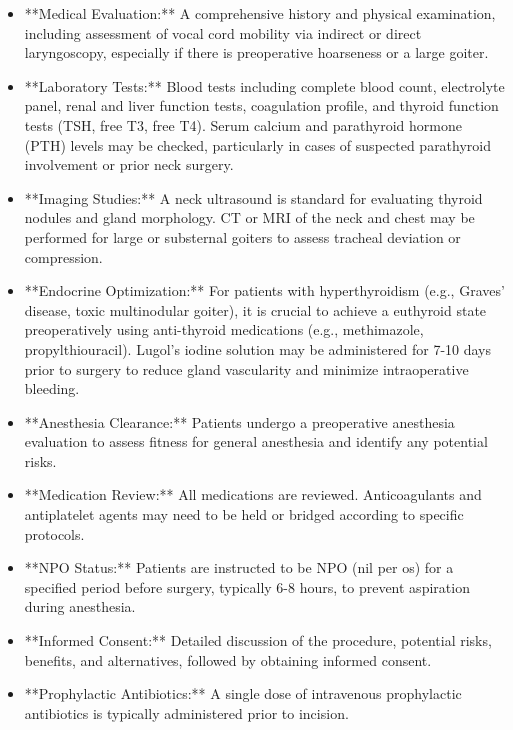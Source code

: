 \begin{itemize}
  \item **Medical Evaluation:** A comprehensive history and physical examination, including assessment of vocal cord mobility via indirect or direct laryngoscopy, especially if there is preoperative hoarseness or a large goiter.
  
  \item **Laboratory Tests:** Blood tests including complete blood count, electrolyte panel, renal and liver function tests, coagulation profile, and thyroid function tests (TSH, free T3, free T4). Serum calcium and parathyroid hormone (PTH) levels may be checked, particularly in cases of suspected parathyroid involvement or prior neck surgery.
  
  \item **Imaging Studies:** A neck ultrasound is standard for evaluating thyroid nodules and gland morphology. CT or MRI of the neck and chest may be performed for large or substernal goiters to assess tracheal deviation or compression.
  
  \item **Endocrine Optimization:** For patients with hyperthyroidism (e.g., Graves' disease, toxic multinodular goiter), it is crucial to achieve a euthyroid state preoperatively using anti-thyroid medications (e.g., methimazole, propylthiouracil). Lugol's iodine solution may be administered for 7-10 days prior to surgery to reduce gland vascularity and minimize intraoperative bleeding.
  
  \item **Anesthesia Clearance:** Patients undergo a preoperative anesthesia evaluation to assess fitness for general anesthesia and identify any potential risks.
  
  \item **Medication Review:** All medications are reviewed. Anticoagulants and antiplatelet agents may need to be held or bridged according to specific protocols.
  
  \item **NPO Status:** Patients are instructed to be NPO (nil per os) for a specified period before surgery, typically 6-8 hours, to prevent aspiration during anesthesia.
  
  \item **Informed Consent:** Detailed discussion of the procedure, potential risks, benefits, and alternatives, followed by obtaining informed consent.
  
  \item **Prophylactic Antibiotics:** A single dose of intravenous prophylactic antibiotics is typically administered prior to incision.
\end{itemize}


